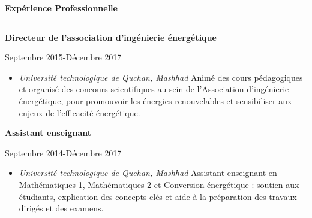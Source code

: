 \documentclass[a4paper]{letter}
\newcommand{\divider}{\rule{\linewidth}{0.9pt}}
\begin{document}
\begin{minipage}[t]{0.60\textwidth}
\begin{itemize}
\end{itemize}
\vspace{3mm}





{\large \textbf{Expérience Professionnelle}}
\divider
\vspace{1mm}
{\textbf{Directeur de l'association d'ingénierie énergétique}}

{\footnotesize Septembre 2015-Décembre 2017}
\begin{itemize}
   \footnotesize \item \textit{Université technologique de Quchan, Mashhad}
   \newline
   Animé des cours pédagogiques et organisé des concours scientifiques au sein de l'Association d'ingénierie énergétique, pour promouvoir les énergies renouvelables et sensibiliser aux enjeux de l'efficacité énergétique.
\end{itemize}

\vspace{3mm}

{ \textbf{Assistant enseignant}}

{ \footnotesize Septembre 2014-Décembre 2017}
\begin{itemize}
    \footnotesize \item \textit{Université technologique de Quchan, Mashhad}
    \newline
    Assistant enseignant en Mathématiques 1, Mathématiques 2 et Conversion énergétique : soutien aux étudiants, explication des concepts clés et aide à la préparation des travaux dirigés et des examens.
\end{itemize}


\vspace{3mm}




\end{minipage}
\end{document}
